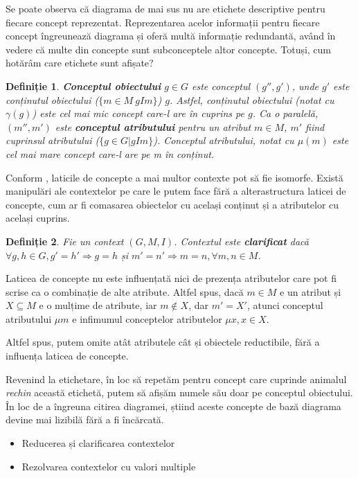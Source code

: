 \documentclass[12pt, a4paper, twoside, romanian]{teza-upb}
\newtheorem{defn}{Definiție}
\begin{document}
    Se poate observa că diagrama de mai sus nu are etichete descriptive pentru fiecare concept reprezentat.
    Reprezentarea acelor informații pentru fiecare concept îngreunează diagrama și oferă multă informație redundantă, având în vedere că multe din concepte sunt subconceptele altor concepte. Totuși, cum hotărâm care etichete sunt afișate?



    \begin{defn}
      \textbf{Conceptul obiectului} $g \in G$ este conceptul $(g'', g')$, unde $g'$ este conținutul obiectului ($\{m \in M \ gIm\}$) $g$. Astfel, conținutul obiectului (notat cu $\gamma(g)$) este cel mai mic concept care-l are în cuprins pe $g$. Ca o paralelă, $(m'', m')$ este \textbf{conceptul atributului} pentru un atribut $m \in M$, $m'$ fiind cuprinsul atributului ($\{ g \in G|gIm\}$). Conceptul atributului, notat cu $\mu(m)$ este cel mai mare concept care-l are pe m în conținut.
    \end{defn}

    
    Conform \cite{Ganter:1997:FCA:550737}, laticile de concepte a mai multor contexte pot să fie isomorfe. Există manipulări ale contextelor pe care le putem face fără a alterastructura laticei de concepte, cum ar fi comasarea obiectelor cu același conținut și a atributelor cu același cuprins. 

    \begin{defn}
      Fie un context $(G, M, I)$. Contextul este \textbf{clarificat} dacă $\forall g,h \in G, g' = h' \Rightarrow g = h$ și $m' = n' \Rightarrow m = n, \forall m,n \in M$.
    \end{defn}

    Laticea de concepte nu este influențată nici de prezența atributelor care pot fi scrise ca o combinație de alte atribute. Altfel spus, dacă $ m \in M$ e un atribut și $X \subseteq M$ e o mulțime de atribute, iar $m \notin X$, dar $m' = X'$, atunci conceptul atributului $\mu m$ e infimumul conceptelor atributelor $\mu x, x \in X$.

    Altfel spus, putem omite atât atributele cât și obiectele reductibile, fără a influența laticea de concepte.
  
    Revenind la etichetare, în loc să repetăm pentru concept care cuprinde animalul \textit{rechin} această etichetă, putem să afișăm numele său doar pe conceptul obiectului. În loc de a îngreuna citirea diagramei, știind aceste concepte de bază diagrama devine mai lizibilă fără a fi încărcată.
    \begin{itemize}
      \item Reducerea și clarificarea contextelor
      \item Rezolvarea contextelor cu valori multiple
    \end{itemize}
\end{document}
